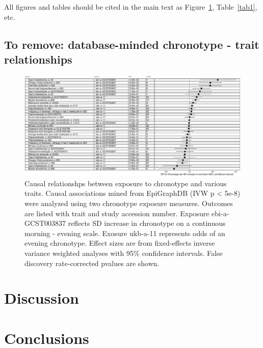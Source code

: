 \documentclass[journal,article,submit,moreauthors,pdftex]{Definitions/mdpi}
\begin{document}
All figures and tables should be cited in the main text as Figure~\ref{forestIVW}, Table~\ref{tab1}, etc.

\subsection{To remove: database-minded chronotype - trait relationships}



\begin{figure}[htbp]
	\centering
	\includegraphics[width=0.5\linewidth]{Figs/forestIVW.pdf}
	\caption{Causal relationshps between exposure to chronotype and various traits. Causal associations mined from EpiGraphDB (IVW p < 5e-8) were analyzed using two chronotype exposure measures. Outcomes are listed with trait and study accession number. Exposure ebi-a-GCST003837 reflects SD increase in chronotype on a continuous morning - evening scale. Exosure ukb-a-11 represents odds of an evening chronotype. Effect sizes are from fixed-effects inverse variance weighted analyses with 95\% confidence intervals. False discovery rate-corrected pvalues are shown.}
	\label{forestIVW}
\end{figure}

\subsection{}







\section{Discussion}



\section{Conclusions}
\end{document}
